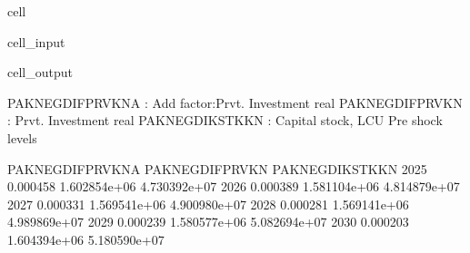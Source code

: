\documentclass[letterpaper,10pt,english]{jupyterBook}
\begin{document}
\begin{sphinxuseclass}{cell}\begin{sphinxVerbatimInput}

\begin{sphinxuseclass}{cell_input}
\begin{sphinxVerbatim}[commandchars=\\\{\}]

\PYG{p}{[}\PYG{p}{[}\PYG{p}{]}\PYG{p}{]}
\PYG{p}{[}\PYG{p}{[}\PYG{p}{]}\PYG{p}{]}

\end{sphinxVerbatim}

\end{sphinxuseclass}\end{sphinxVerbatimInput}
\begin{sphinxVerbatimOutput}

\begin{sphinxuseclass}{cell_output}
\begin{sphinxVerbatim}[commandchars=\\\{\}]
PAKNEGDIFPRVKN\PYGZus{}A : Add factor:Prvt. Investment real
PAKNEGDIFPRVKN   : Prvt. Investment real
PAKNEGDIKSTKKN   : Capital stock, LCU
Pre shock levels
\end{sphinxVerbatim}

\begin{sphinxVerbatim}[commandchars=\\\{\}]
      PAKNEGDIFPRVKN\PYGZus{}A  PAKNEGDIFPRVKN  PAKNEGDIKSTKKN
2025         \PYGZhy{}0.000458    1.602854e+06    4.730392e+07
2026         \PYGZhy{}0.000389    1.581104e+06    4.814879e+07
2027         \PYGZhy{}0.000331    1.569541e+06    4.900980e+07
2028         \PYGZhy{}0.000281    1.569141e+06    4.989869e+07
2029         \PYGZhy{}0.000239    1.580577e+06    5.082694e+07
2030         \PYGZhy{}0.000203    1.604394e+06    5.180590e+07
\end{sphinxVerbatim}

\end{sphinxuseclass}\end{sphinxVerbatimOutput}

\end{sphinxuseclass}
\end{document}
